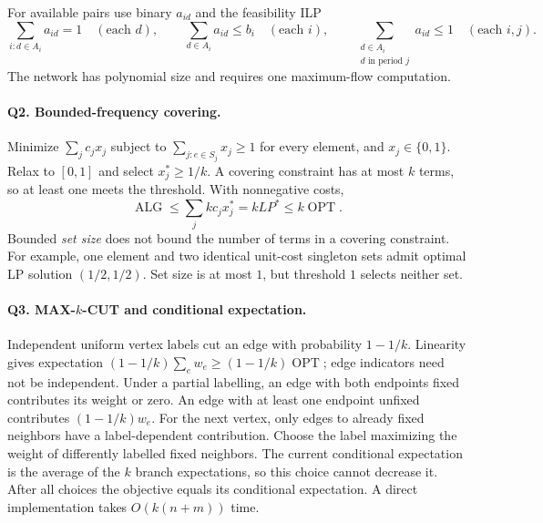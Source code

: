 \documentclass[10pt]{article}
\theoremstyle{definition}
\newcommand{\OPT}{\operatorname{OPT}}
\newcommand{\ALG}{\operatorname{ALG}}
\begin{document}
For available pairs use binary $a_{id}$ and the feasibility ILP
\[
\sum_{i:d\in A_i}a_{id}=1\quad(\text{each }d),\qquad
\sum_{d\in A_i}a_{id}\le b_i\quad(\text{each }i),\qquad
\sum_{\substack{d\in A_i\\d\text{ in period }j}}a_{id}\le1
\quad(\text{each }i,j).
\]
The network has polynomial size and requires one maximum-flow computation.

\paragraph{Q2. Bounded-frequency covering.}
Minimize $\sum_j c_jx_j$ subject to
$\sum_{j:e\in S_j}x_j\ge1$ for every element, and $x_j\in\{0,1\}$.
Relax to $[0,1]$ and select $x_j^*\ge1/k$.  A covering constraint has at
most $k$ terms, so at least one meets the threshold.  With nonnegative costs,
\[
\ALG\le\sum_j kc_jx_j^*=kLP^*\le k\OPT.
\]
Bounded \emph{set size} does not bound the number of terms in a covering
constraint.  For example, one element and two identical unit-cost singleton
sets admit optimal LP solution $(1/2,1/2)$.  Set size is at most $1$, but
threshold $1$ selects neither set.

\paragraph{Q3. \texorpdfstring{MAX-$k$-CUT}{MAX-k-CUT} and conditional expectation.}
Independent uniform vertex labels cut an edge with probability $1-1/k$.
Linearity gives expectation $(1-1/k)\sum_e w_e\ge(1-1/k)\OPT$; edge
indicators need not be independent.  Under a partial labelling, an edge
with both endpoints fixed contributes its weight or zero.  An edge with
at least one endpoint unfixed contributes $(1-1/k)w_e$.  For the next
vertex, only edges to already fixed neighbors have a label-dependent
contribution.  Choose the label maximizing the weight of differently
labelled fixed neighbors.  The current conditional expectation is the
average of the $k$ branch expectations, so this choice cannot decrease it.
After all choices the objective equals its conditional expectation.
A direct implementation takes $O(k(n+m))$ time.
\end{document}
